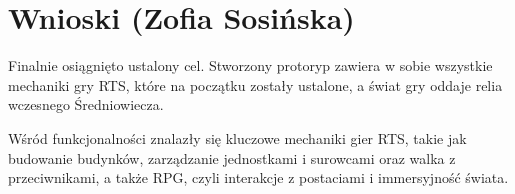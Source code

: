 \section{Wnioski (Zofia Sosińska)}
Finalnie osiągnięto ustalony cel. Stworzony protoryp zawiera w sobie wszystkie mechaniki gry RTS,
które na początku zostały ustalone, a świat gry oddaje relia wczesnego Średniowiecza. 

Wśród funkcjonalności znalazły się kluczowe mechaniki gier RTS, takie jak budowanie budynków, zarządzanie
jednostkami i surowcami oraz walka z przeciwnikami, a także RPG, czyli interakcje z postaciami i immersyjność
świata. 